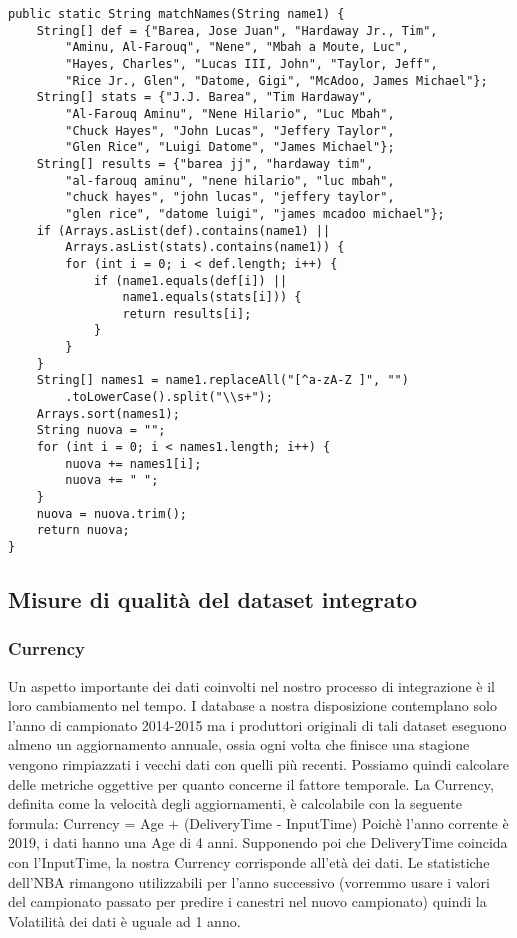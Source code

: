 \begin{code}
\begin{verbatim}
public static String matchNames(String name1) {
	String[] def = {"Barea, Jose Juan", "Hardaway Jr., Tim", 
		"Aminu, Al-Farouq", "Nene", "Mbah a Moute, Luc",
		"Hayes, Charles", "Lucas III, John", "Taylor, Jeff",
		"Rice Jr., Glen", "Datome, Gigi", "McAdoo, James Michael"};
	String[] stats = {"J.J. Barea", "Tim Hardaway", 
		"Al-Farouq Aminu", "Nene Hilario", "Luc Mbah",
		"Chuck Hayes", "John Lucas", "Jeffery Taylor",
		"Glen Rice", "Luigi Datome", "James Michael"};
	String[] results = {"barea jj", "hardaway tim", 
		"al-farouq aminu", "nene hilario", "luc mbah",
		"chuck hayes", "john lucas", "jeffery taylor",
		"glen rice", "datome luigi", "james mcadoo michael"};
	if (Arrays.asList(def).contains(name1) || 
		Arrays.asList(stats).contains(name1)) {
		for (int i = 0; i < def.length; i++) {
			if (name1.equals(def[i]) || 
				name1.equals(stats[i])) {
				return results[i];
			}
		}  
	}
	String[] names1 = name1.replaceAll("[^a-zA-Z ]", "")
		.toLowerCase().split("\\s+");
	Arrays.sort(names1);
	String nuova = "";
	for (int i = 0; i < names1.length; i++) {
		nuova += names1[i];
		nuova += " ";
	}
	nuova = nuova.trim();
	return nuova;
}
\end{verbatim}
\end{code}


\subsection{Misure di qualità del dataset integrato}

\subsubsection{Currency}
Un aspetto \cite{doi:10.1287/mnsc.44.4.462} importante dei dati coinvolti nel nostro processo di integrazione è il loro cambiamento nel tempo. I database a nostra disposizione contemplano solo l’anno di campionato 2014-2015 ma i produttori originali di tali dataset eseguono almeno un aggiornamento annuale, ossia ogni volta che finisce una stagione vengono rimpiazzati i vecchi dati con quelli più recenti.
Possiamo quindi calcolare delle metriche oggettive per quanto concerne il fattore temporale.
La Currency, definita come la velocità degli aggiornamenti, è calcolabile con la seguente formula:
Currency = Age + (DeliveryTime - InputTime)
Poichè l’anno corrente è 2019, i dati hanno una Age di 4 anni. Supponendo poi che DeliveryTime coincida con l’InputTime, la nostra Currency corrisponde all’età dei dati.
Le statistiche dell’NBA rimangono utilizzabili per l’anno successivo (vorremmo usare i valori del campionato passato per predire i canestri nel nuovo campionato) quindi la Volatilità dei dati è uguale ad 1 anno.

